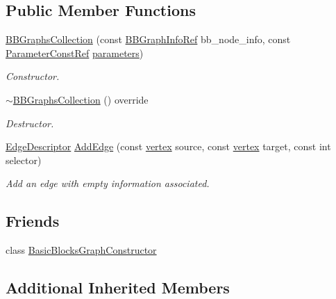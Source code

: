 \subsection*{Public Member Functions}
\begin{DoxyCompactItemize}
\item 
\hyperlink{classBBGraphsCollection_af667f3f37b38a6c1e24c510c4b867635}{B\+B\+Graphs\+Collection} (const \hyperlink{basic__block_8hpp_a7fedb7a9906aec21ae08b9f603e42b6d}{B\+B\+Graph\+Info\+Ref} bb\+\_\+node\+\_\+info, const \hyperlink{Parameter_8hpp_a37841774a6fcb479b597fdf8955eb4ea}{Parameter\+Const\+Ref} \hyperlink{structgraphs__collection_adfc2ecaf0a04245a3cfd572c213ef1ed}{parameters})
\begin{DoxyCompactList}\small\item\em Constructor. \end{DoxyCompactList}\item 
\hyperlink{classBBGraphsCollection_a7e0b07719033e01bea52afd9f399b25c}{$\sim$\+B\+B\+Graphs\+Collection} () override
\begin{DoxyCompactList}\small\item\em Destructor. \end{DoxyCompactList}\item 
\hyperlink{graph_8hpp_a9eb9afea34e09f484b21f2efd263dd48}{Edge\+Descriptor} \hyperlink{classBBGraphsCollection_a890fe925b817da233596497452942d50}{Add\+Edge} (const \hyperlink{graph_8hpp_abefdcf0544e601805af44eca032cca14}{vertex} source, const \hyperlink{graph_8hpp_abefdcf0544e601805af44eca032cca14}{vertex} target, const int selector)
\begin{DoxyCompactList}\small\item\em Add an edge with empty information associated. \end{DoxyCompactList}\end{DoxyCompactItemize}
\subsection*{Friends}
\begin{DoxyCompactItemize}
\item 
class \hyperlink{classBBGraphsCollection_a2ec16ee525628d633fa2b269c262b5af}{Basic\+Blocks\+Graph\+Constructor}
\end{DoxyCompactItemize}
\subsection*{Additional Inherited Members}


